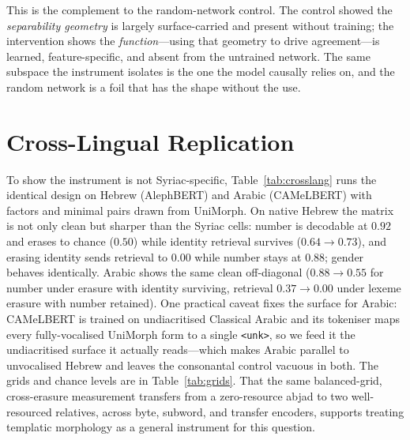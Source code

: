 \documentclass[11pt]{article}
\begin{document}
This is the complement to the random-network control. The control showed the
\emph{separability geometry} is largely surface-carried and present without training;
the intervention shows the \emph{function}---using that geometry to drive
agreement---is learned, feature-specific, and absent from the untrained network. The
same subspace the instrument isolates is the one the model causally relies on, and
the random network is a foil that has the shape without the use.

\section{Cross-Lingual Replication}
\label{sec:crosslang}

To show the instrument is not Syriac-specific, Table~\ref{tab:crosslang} runs the
identical design on Hebrew (AlephBERT) and Arabic (CAMeLBERT) with factors and
minimal pairs drawn from UniMorph. On native Hebrew the matrix is not only clean but
sharper than the Syriac cells: number is decodable at $0.92$ and erases to chance
($0.50$) while identity retrieval survives ($0.64\!\to\!0.73$), and erasing identity
sends retrieval to $0.00$ while number stays at $0.88$; gender behaves identically.
Arabic shows the same clean off-diagonal ($0.88\!\to\!0.55$ for number under
erasure with identity surviving, retrieval $0.37\!\to\!0.00$ under lexeme erasure
with number retained). One practical caveat fixes the surface for Arabic: CAMeLBERT
is trained on undiacritised Classical Arabic and its tokeniser maps every
fully-vocalised UniMorph form to a single \texttt{<unk>}, so we feed it the
undiacritised surface it actually reads---which makes Arabic parallel to unvocalised
Hebrew and leaves the consonantal control vacuous in both. The grids and chance
levels are in Table~\ref{tab:grids}. That the same balanced-grid, cross-erasure
measurement transfers from a zero-resource abjad to two well-resourced relatives,
across byte, subword, and transfer encoders, supports treating templatic morphology
as a general instrument for this question.

\begin{table}[t]
  \centering
  \small
  
  \caption{Cross-lingual replication (model-facing surface; mean${}\pm{}$SD over
  five seeds). The same cross-erasure selectivity holds for native Hebrew and
  Arabic; on Hebrew it is sharper than for Syriac.}
  \label{tab:crosslang}
\end{table}
\end{document}
